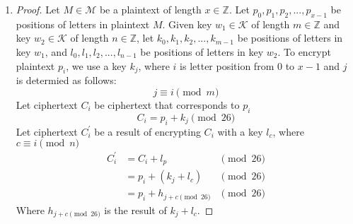 \documentclass[11pt]{article}
\newcommand{\K}{\mathcal{K}}
\newcommand{\M}{\mathcal{M}}
\newcommand{\Z}{\mathbb{Z}}
\theoremstyle{definition}
\begin{document}
\begin{enumerate}
  \item
    \begin{proof}
      Let $M \in \M$ be a plaintext of length $x \in \Z$. Let $p_0, p_1, p_2, ...,p_{x - 1}$ be positions of letters in plaintext $M$. Given key $w_1 \in \K$ of length $m \in \Z$ and key $w_2 \in \K$ of length $n \in \Z$, let $k_0, k_1, k_2, ...,k_{m - 1}$ be positions of letters in key $w_1$, and $l_0, l_1, l_2, ...,l_{n - 1}$ be positions of letters in key $w_2$. To encrypt plaintext $p_i$, we use a key $k_j$, where $i$ is letter position from $0$ to $x - 1$ and $j$ is determied as follows:
      \[
        j \equiv i \pmod m
      \]
      Let ciphertext $C_i$ be ciphertext that corresponds to $p_i$
      \[
        C_i = p_i + k_j \pmod {26}
      \]
      Let ciphertext $C^{'}_i$ be a result of encrypting $C_i$ with a key $l_c$, where $c \equiv i \pmod n$
      \begin{equation*}
      \begin{aligned}
        C^{'}_i &= C_i + l_p &\pmod {26} \\
                &= p_i + (k_j + l_c) &\pmod {26} \\
                &= p_i + h_{j + c \pmod{26}} &\pmod {26}
      \end{aligned}
      \end{equation*}
      Where $h_{j + c \pmod{26}}$ is the result of $k_j + l_c$. 
    \end{proof}
\end{enumerate}

\newpage
\end{document}
